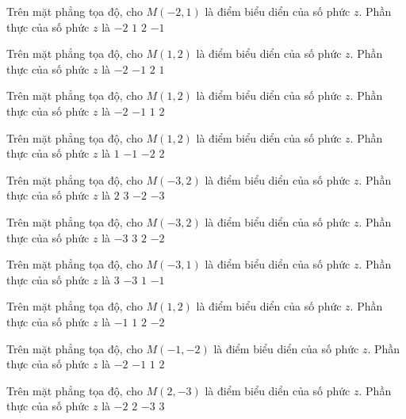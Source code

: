 \begin{ex}
 Trên mặt phẳng tọa độ, cho $M(-2,1)$ là điểm biểu diển của số phức $z$. Phần thực của số phức $z$ là
\choice
{\True $-2$}
{$1$}
{$2$}
{$-1$}
\end{ex}
\begin{ex}
 Trên mặt phẳng tọa độ, cho $M(1,2)$ là điểm biểu diển của số phức $z$. Phần thực của số phức $z$ là
\choice
{$-2$}
{$-1$}
{$2$}
{\True $1$}
\end{ex}
\begin{ex}
 Trên mặt phẳng tọa độ, cho $M(1,2)$ là điểm biểu diển của số phức $z$. Phần thực của số phức $z$ là
\choice
{$-2$}
{$-1$}
{\True $1$}
{$2$}
\end{ex}
\begin{ex}
 Trên mặt phẳng tọa độ, cho $M(1,2)$ là điểm biểu diển của số phức $z$. Phần thực của số phức $z$ là
\choice
{\True $1$}
{$-1$}
{$-2$}
{$2$}
\end{ex}
\begin{ex}
 Trên mặt phẳng tọa độ, cho $M(-3,2)$ là điểm biểu diển của số phức $z$. Phần thực của số phức $z$ là
\choice
{$2$}
{$3$}
{$-2$}
{\True $-3$}
\end{ex}
\begin{ex}
 Trên mặt phẳng tọa độ, cho $M(-3,2)$ là điểm biểu diển của số phức $z$. Phần thực của số phức $z$ là
\choice
{\True $-3$}
{$3$}
{$2$}
{$-2$}
\end{ex}
\begin{ex}
 Trên mặt phẳng tọa độ, cho $M(-3,1)$ là điểm biểu diển của số phức $z$. Phần thực của số phức $z$ là
\choice
{$3$}
{\True $-3$}
{$1$}
{$-1$}
\end{ex}
\begin{ex}
 Trên mặt phẳng tọa độ, cho $M(1,2)$ là điểm biểu diển của số phức $z$. Phần thực của số phức $z$ là
\choice
{$-1$}
{\True $1$}
{$2$}
{$-2$}
\end{ex}
\begin{ex}
 Trên mặt phẳng tọa độ, cho $M(-1,-2)$ là điểm biểu diển của số phức $z$. Phần thực của số phức $z$ là
\choice
{$-2$}
{\True $-1$}
{$1$}
{$2$}
\end{ex}
\begin{ex}
 Trên mặt phẳng tọa độ, cho $M(2,-3)$ là điểm biểu diển của số phức $z$. Phần thực của số phức $z$ là
\choice
{$-2$}
{\True $2$}
{$-3$}
{$3$}
\end{ex}
